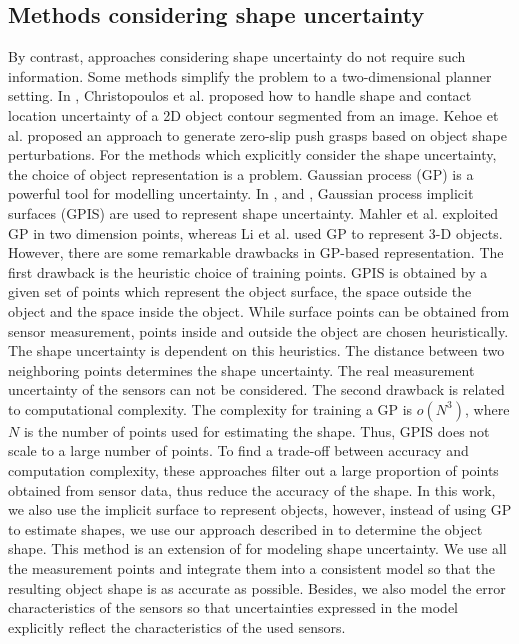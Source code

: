 \subsection{Methods considering shape uncertainty}
By contrast, approaches considering shape uncertainty do not require such information. Some methods simplify the problem to a two-dimensional planner setting. In \cite{Christopoulos2007}, Christopoulos et al. proposed how to handle shape and contact location uncertainty of a 2D object contour segmented from an image. Kehoe et al. \cite{Kehoe2012} proposed an approach to generate zero-slip push grasps based on object shape perturbations. For the methods which explicitly consider the shape uncertainty, the choice of object representation is a problem. Gaussian process (GP)\cite{rasmussen2006gaussian} is a powerful tool for modelling uncertainty. In \cite{Mahler2015}, \cite{Li2016} and \cite{Dragiev2011}, Gaussian process implicit surfaces (GPIS) \cite{Williams2007} are used to represent  shape uncertainty. Mahler et al. exploited GP in two dimension points, whereas Li et al. used GP to represent 3-D objects. However, there are some remarkable drawbacks in GP-based representation. The first drawback is the heuristic choice of training points. GPIS is obtained by a given set of points which represent the object surface, the space outside the object and the space inside the object. While surface points can be obtained from sensor measurement, points inside and outside the object are chosen heuristically. The shape uncertainty is dependent on this heuristics. The distance between two neighboring points determines the shape uncertainty. The real measurement uncertainty of the sensors can not be considered. The second drawback is related to computational complexity. The complexity for training a GP is $o(N^3)$, where $N$ is the number of points used for estimating the shape. Thus, GPIS does not scale to a large number of points. To find a trade-off between accuracy and computation complexity, these approaches filter out a large proportion of points obtained from sensor data, thus reduce the accuracy of the shape. In this work, we also use the implicit surface to represent objects, however, instead of using GP to estimate shapes, we use our approach described in \cite{Dietrich2016} to determine the object shape. This method is an extension of \cite{newcombe2011kinectfusion} for modeling shape uncertainty. We use all the measurement points and integrate them into a consistent model so that the resulting object shape is as accurate as possible. Besides, we also model the error characteristics of the sensors so that uncertainties expressed in the model explicitly reflect the characteristics of the used sensors. 
